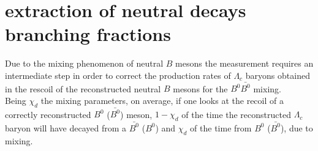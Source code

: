     \begin{table}[H]
        \centering
    \label{tab:SixStreams_chargedAntiCorrLamBR}
    \caption{Monte Carlo measured branching fraction values of charged anticorrelated decays}
    \end{table}
    
\newpage

\section{extraction of neutral decays branching fractions}
Due to the mixing phenomenon of neutral $B$ mesons the measurement requires an intermediate step in order to correct the production 
 rates of $\Lambda_c$ baryons obtained in the rescoil of the reconstructed neutral $B$ mesons for the $B^0\bar{B^0}$ mixing. \\
Being $\chi_d$ the mixing parameters, on average, if one looks at the recoil of a correctly reconstructed $B^0$ ($\bar{B^0}$) meson, $1 - \chi_d$ of the time the reconstructed $\Lambda_c$ baryon
will have decayed from a $\bar{B^0}$ ($B^0$) and $\chi_d$ of the time from $B^0$ ($\bar{B^0}$), due to mixing.\\

